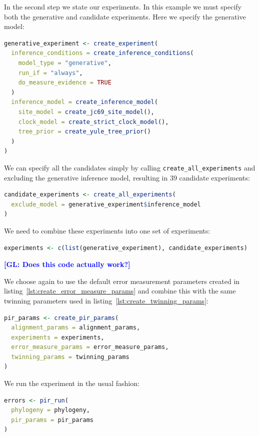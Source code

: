 \documentclass{article}
\newcommand{\giovanni}[1]{\textcolor{blue}{\textbf{[GL: #1]}}}
\begin{document}
In the second step we state our experiments. 
In this example we must specify both the generative and candidate experiments. 
Here we specify the generative model:

\begin{lstlisting}[language=R, floatplacement=H, frame=single]
generative_experiment <- create_experiment(
  inference_conditions = create_inference_conditions(
    model_type = "generative",
    run_if = "always",
    do_measure_evidence = TRUE
  )
  inference_model = create_inference_model(
    site_model = create_jc69_site_model(),
    clock_model = create_strict_clock_model(),
    tree_prior = create_yule_tree_prior()
  )
)
\end{lstlisting}

We can specify all the candidates simply by calling 
\verb;create_all_experiments; and excluding the generative inference model,
resulting in 39 candidate experiments:

\begin{lstlisting}[language=R, floatplacement=H, frame=single]
candidate_experiments <- create_all_experiments(
  exclude_model = generative_experiment$inference_model
)
\end{lstlisting}

We need to combine these experiments into one set of experiments:

\begin{lstlisting}[language=R, floatplacement=H, frame=single]
experiments <- c(list(generative_experiment), candidate_experiments)
\end{lstlisting}
\giovanni{Does this code actually work?}

We choose again to use the default error measurement parameters
created in listing~\ref{lst:create_error_measure_params}
and combine this with the same twinning parameters 
used in listing~\ref{lst:create_twinning_params}:

\begin{lstlisting}[language=R, floatplacement=H, frame=single]
pir_params <- create_pir_params(
  alignment_params = alignment_params,
  experiments = experiments,
  error_measure_params = error_measure_params,
  twinning_params = twinning_params
)
\end{lstlisting}

We run the experiment in the usual fashion:

\begin{lstlisting}[language=R, floatplacement=H, frame=single]
errors <- pir_run(
  phylogeny = phylogeny,
  pir_params = pir_params
)
\end{lstlisting}
\end{document}
